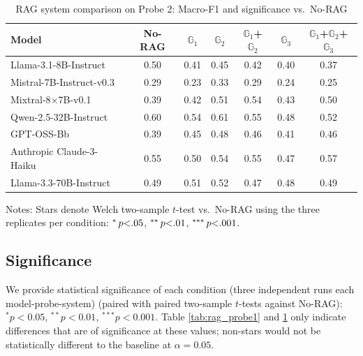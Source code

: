 \begin{table}[t]
  \centering
  \small
    \caption{RAG system comparison on {Probe 2}: Macro-F1  and significance vs.\ No-RAG}
    \label{tab:rag_probe2}
    \begin{tabular}{lcccccc}
      \toprule
      \textbf{Model} & \textbf{No-RAG} & $\mathbb{G}_1$ & $\mathbb{G}_2$ & $\mathbb{G}_1$+$\mathbb{G}_2$ & $\mathbb{G}_3$ & $\mathbb{G}_1$+$\mathbb{G}_2$+$\mathbb{G}_3$     \\
      \midrule
      Llama-3.1-8B-Instruct    & 0.50 & 0.41\sym{*}  & 0.45         & 0.42\sym{*}    & 0.40\sym{*}  & 0.37\sym{**} \\
      Mistral-7B-Instruct-v0.3 & 0.29 & 0.23\sym{*}  & 0.33         & 0.29           & 0.24\sym{*}  & 0.25 \\
      Mixtral-8$\times$7B-v0.1 & 0.39 & 0.42         & 0.51\sym{*}  & 0.54\sym{*}    & 0.43         & 0.50\sym{*} \\
      Qwen-2.5-32B-Instruct    & 0.60 & 0.54\sym{**} & 0.61         & 0.55\sym{*}    & 0.48\sym{**} & 0.52\sym{**} \\
      GPT-OSS-Bb              & 0.39 & 0.45         & 0.48\sym{*}  & 0.46           & 0.41         & 0.46 \\
      Anthropic Claude-3-Haiku & 0.55 & 0.50\sym{*}  & 0.54         & 0.55           & 0.47\sym{**} & 0.57\sym{*} \\
      Llama-3.3-70B-Instruct   & 0.49 & 0.51         & 0.52         & 0.47           & 0.48         & 0.49 \\
      \bottomrule
    \end{tabular}
      \footnotesize
     
     Notes: Stars denote Welch two-sample $t$-test vs.\ No-RAG using the three replicates per condition:
      \;$\sym{*}\,p{<}.05$, \;$\sym{**}\,p{<}.01$, \;$\sym{***}\,p{<}.001$.
\end{table}


\subsection{Significance}
We provide statistical significance of each condition (three independent runs each model-probe-system) (paired with paired two-sample $t$-tests against No-RAG): $^{*}\!p<0.05$, $^{**}\!p<0.01$, $^{***}\!p<0.001$. Table \ref{tab:rag_probe1} and \ref{tab:rag_probe2} only indicate differences that are of significance at these values; non-stars would not be statistically different to the baseline at $\alpha{=}0.05$.

